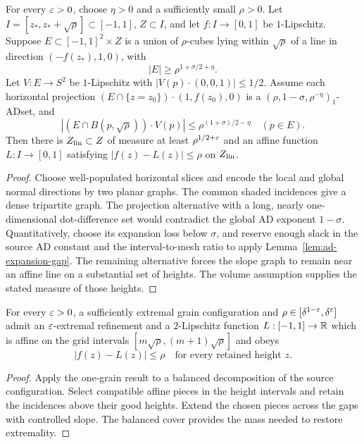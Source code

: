 \begin{lemma}
\label{lem:locally-affine}
For every $\varepsilon>0$, choose $\eta>0$ and a sufficiently small
$\rho>0$. Let $I=[z_*,z_*+\sqrt\rho]\subset[-1,1]$,
$Z\subset I$, and let $f:I\to[0,1]$ be $1$-Lipschitz. Suppose
$E\subset[-1,1]^2\times Z$ is a union of $\rho$-cubes lying within
$\sqrt\rho$ of a line in direction $(-f(z_*),1,0)$, with
\[
                       |E|\geq\rho^{1+\sigma/2+\eta}.
\]
Let $V:E\to S^2$ be $1$-Lipschitz with $|V(p)\cdot(0,0,1)|\leq1/2$.
Assume each horizontal projection
$(E\cap\{z=z_0\})\cdot(1,f(z_0),0)$ is a
$(\rho,1-\sigma,\rho^{-\eta})_1$-ADset, and
\[
       |(E\cap B(p,\sqrt\rho))\cdot V(p)|
                 \leq\rho^{(1+\sigma)/2-\eta}\quad(p\in E).
\]
Then there is $Z_{\rm lin}\subset Z$ of measure at least
$\rho^{1/2+\varepsilon}$ and an affine function $L:I\to[0,1]$ satisfying
$|f(z)-L(z)|\leq\rho$ on $Z_{\rm lin}$.
\end{lemma}
\begin{proof}
Choose well-populated horizontal slices and encode the local and
global normal directions by two planar graphs. The common shaded
incidences give a dense tripartite graph. The projection alternative
with a long, nearly one-dimensional dot-difference set would contradict
the global AD exponent $1-\sigma$. Quantitatively, choose its expansion
loss below $\sigma$, and reserve enough slack in the source AD constant
and the interval-to-mesh ratio to apply Lemma~\ref{lem:ad-expansion-gap}.
The remaining alternative forces
the slope graph to remain near an affine line on a substantial set
of heights. The volume assumption supplies the stated measure of
those heights.
\end{proof}

\begin{lemma}
\label{lem:piecewise-affine}
For every $\varepsilon>0$, a sufficiently extremal grain configuration and
$\rho\in[\delta^{1-\varepsilon},\delta^\varepsilon]$ admit an
$\varepsilon$-extremal refinement and a $2$-Lipschitz function
$L:[-1,1]\to\mathbb{R}$ which is affine on the grid intervals
$[m\sqrt\rho,(m+1)\sqrt\rho]$ and obeys
\[
        |f(z)-L(z)|\leq\rho
        \quad\text{for every retained height }z.
\]
\end{lemma}
\begin{proof}
Apply the one-grain result to a balanced decomposition of the source
configuration. Select compatible affine pieces in the height intervals
and retain the incidences above their good heights. Extend the chosen
pieces across the gaps with controlled slope. The balanced cover
provides the mass needed to restore extremality.
\end{proof}

